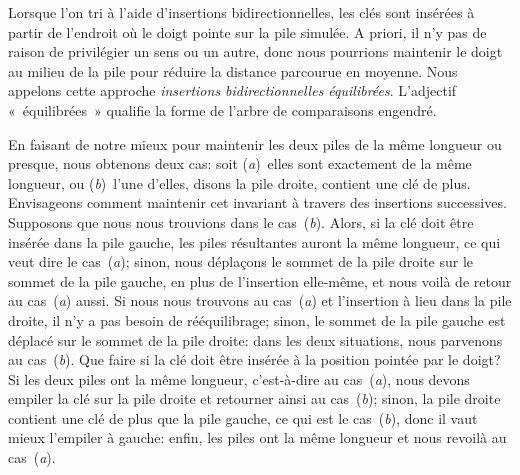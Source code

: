 Lorsque l'on tri à l'aide d'insertions bidirectionnelles, les clés
sont insérées à partir de l'endroit où le doigt pointe sur la pile
simulée. A priori, il n'y pas de raison de privilégier un sens ou un
autre, donc nous pourrions maintenir le doigt au milieu de la pile
pour réduire la distance parcourue en moyenne. Nous appelons cette
approche \emph{insertions bidirectionnelles équilibrées}. L'adjectif
«~équilibrées~» qualifie la forme de l'arbre de comparaisons engendré.

En faisant de notre mieux pour maintenir les deux piles de la même
longueur ou presque, nous obtenons deux cas: soit (\textsl{a})~elles
sont exactement de la même longueur, ou (\textsl{b})~l'une d'elles,
disons la pile droite, contient une clé de plus. Envisageons comment
maintenir cet invariant à travers des insertions
successives. Supposons que nous nous trouvions dans le
cas~(\textsl{b}). Alors, si la clé doit être insérée dans la pile
gauche, les piles résultantes auront la même longueur, ce qui veut
dire le cas~(\textsl{a}); sinon, nous déplaçons le sommet de la pile
droite sur le sommet de la pile gauche, en plus de l'insertion
elle-même, et nous voilà de retour au cas~(\textsl{a}) aussi. Si nous
nous trouvons au cas~(\textsl{a}) et l'insertion à lieu dans la pile
droite, il n'y a pas besoin de rééquilibrage; sinon, le sommet de la
pile gauche est déplacé sur le sommet de la pile droite: dans les deux
situations, nous parvenons au cas~(\textsl{b}). Que faire si la clé
doit être insérée à la position pointée par le doigt?  Si les deux
piles ont la même longueur, c'est-à-dire au cas~(\textsl{a}), nous
devons empiler la clé sur la pile droite et retourner ainsi au
cas~(\textsl{b}); sinon, la pile droite contient une clé de plus que
la pile gauche, ce qui est le cas~(\textsl{b}), donc il vaut mieux
l'empiler à gauche: enfin, les piles ont la même longueur et nous
revoilà au cas~(\textsl{a}).

